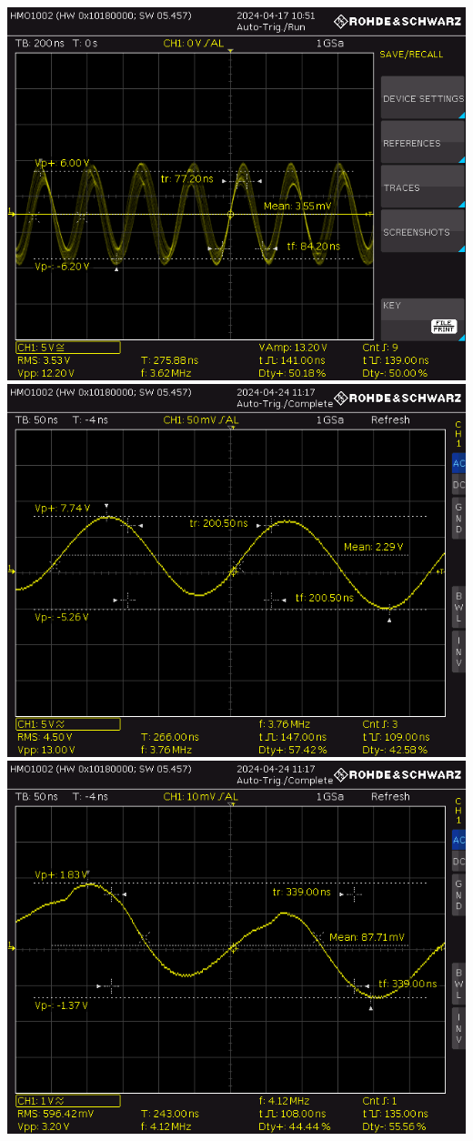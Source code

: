 \documentclass[11pt, letterpaper, openany, oneside]{article}
\begin{document}
\includegraphics[width=\linewidth]{img/KITTYK01.PNG}
\includegraphics[width=\linewidth]{img/KITTYK02.PNG}
\includegraphics[width=\linewidth]{img/KITTYK03.PNG}
\end{document}
